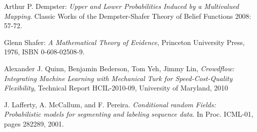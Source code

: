 \begin{thebibliography}{9}

Arthur P. Dempster: \textit{Upper and Lower Probabilities Induced by a Multivalued Mapping}. Classic Works of the Dempster-Shafer Theory of Belief Functions 2008: 57-72.

Glenn Shafer: \textit{A Mathematical Theory of Evidence}, Princeton University Press, 1976, ISBN 0-608-02508-9.

Alexander J. Quinn, Benjamin Bederson, Tom Yeh, Jimmy Lin, \textit{Crowdflow: Integrating Machine Learning with Mechanical Turk for Speed-Cost-Quality Flexibility}, Technical Report HCIL-2010-09, University of Maryland, 2010

J. Lafferty, A. McCallum, and F. Pereira. \textit{Conditional random Fields: Probabilistic models for segmenting and labeling sequence
data}. In Proc. ICML-01, pages 282289, 2001.
\end{thebibliography}